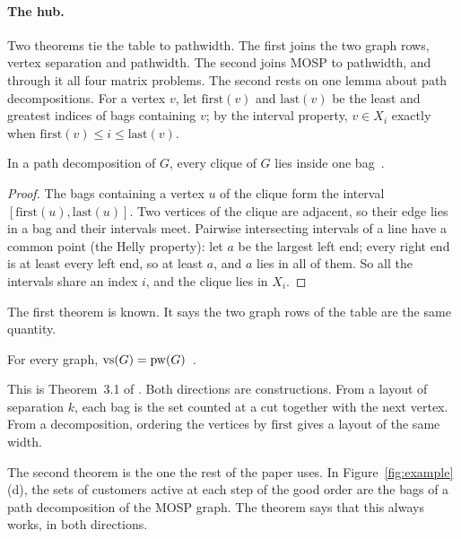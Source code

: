 \paragraph{The hub.} Two theorems tie the table to pathwidth. The first joins
the two graph rows, vertex separation and pathwidth. The second joins MOSP to
pathwidth, and through it all four matrix problems. The second rests on one
lemma about path decompositions. For a vertex $v$, let $\mathrm{first}(v)$ and
$\mathrm{last}(v)$ be the least and greatest indices of bags containing $v$; by
the interval property, $v\in X_i$ exactly when
$\mathrm{first}(v)\le i\le\mathrm{last}(v)$.

\begin{lemma}\label{lem:clique}
In a path decomposition of $G$, every clique of $G$ lies inside one bag~.
\end{lemma}
\begin{proof}
The bags containing a vertex $u$ of the clique form the interval
$[\mathrm{first}(u),\mathrm{last}(u)]$. Two vertices of the clique are
adjacent, so their edge lies in a bag and their intervals meet. Pairwise
intersecting intervals of a line have a common point (the Helly property): let
$a$ be the largest left end; every right end is at least every left end, so at
least $a$, and $a$ lies in all of them. So all the intervals share an index
$i$, and the clique lies in $X_i$.
\end{proof}

The first theorem is known. It says the two graph rows of the table are the
same quantity.

\begin{theorem}\label{thm:vs}
For every graph, $\mathrm{vs}(G)=\mathrm{pw}(G)$~.
\end{theorem}
This is Theorem~3.1 of \citet{LY2002ref13}. Both directions are constructions.
From a layout of separation $k$, each bag is the set counted at a cut together
with the next vertex. From a decomposition, ordering the vertices by
$\mathrm{first}$ gives a layout of the same width.

The second theorem is the one the rest of the paper uses. In
Figure~\ref{fig:example}(d), the sets of customers active at each step of the
good order are the bags of a path decomposition of the MOSP graph. The theorem
says that this always works, in both directions.


